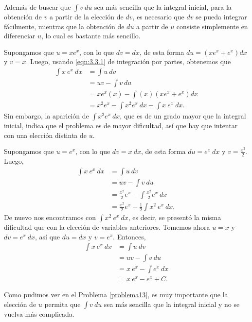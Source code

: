 Además de buscar que $\int v\:du$ sea más sencilla que la integral inicial, para la obtención de $v$ a partir de la elección de $dv$, es necesario que $dv$ se pueda integrar fácilmente, mientras que la obtención de $du$ a partir de $u$ consiste simplemente en diferenciar $u$, lo cual es bastante más sencillo.
\begin{problema}[$\int x\:e^x\:dx$]\label{problema13}
	Supongamos que $u=xe^x$, con lo que $dv=dx$, de esta forma $du=(xe^x+e^x)dx$ y $v=x$. Luego, usando \cref{eqn:3.3.1} de integración por partes, obtenemos que
	\begin{align*}
		\int x\:e^x\:dx&=\int u\:dv\\
					&=uv-\int v\:du\\
					&=xe^x(x)-\int (x)(xe^x+e^x)dx\\
					&=x^2e^x-\int x^2e^x\:dx-\int x\:e^x\:dx.
	\end{align*}
	Sin embargo, la aparición de $\int x^2e^x\:dx$, que es de un grado mayor que la integral inicial, indica que el problema es de mayor dificultad, así que hay que intentar con una elección distinta de $u$.
	
	Supongamos que $u=e^x$, con lo que $dv=x\: dx$, de esta forma $du=e^x\:dx$ y $v=\frac{x^2}{2}$. Luego,
	\begin{align*}
		\int x\:e^x\:dx&=\int u\:dv\\
					&=uv-\int v\:du\\
					&=\frac{x^2}{2}e^x-\int \frac{x^2}{2}e^x\:dx\\
					&=\frac{x^2}{2}e^x-\frac{1}{2}\int x^2\:e^x\:dx,
	\end{align*}
	De nuevo nos encontramos con $\int x^2\:e^x\:dx$, es decir, se presentó la misma dificultad que con la elección de variables anteriores. Tomemos ahora $u=x$ y $dv=e^x\:dx$, así que $du=dx$ y $v=e^x$. Entonces,
	\begin{align*}
		\int x\:e^x\:dx&=\int u\:dv\\
					&=uv-\int v\:du\\
					&=x\:e^x-\int e^x\:dx\\
					&=x\:e^x-e^x+C.
	\end{align*}
\end{problema}
Como pudimos ver en el Problema \ref{problema13}, es muy importante que la elección de $u$ permita que $\int v\:du$ sea más sencilla que la integral inicial y no se vuelva más complicada.

